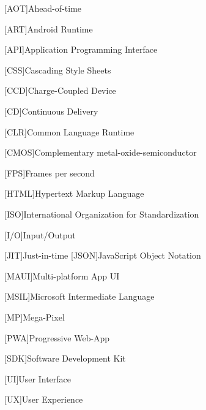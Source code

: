 \begin{acronym}[AAAAA]

[AOT]{Ahead-of-time}

[ART]{Android Runtime}

[API]{Application Programming Interface}

[CSS]{Cascading Style Sheets}

[CCD]{Charge-Coupled Device}

[CD]{Continuous Delivery}

[CLR]{Common Language Runtime}

[CMOS]{Complementary metal-oxide-semiconductor}

[FPS]{Frames per second}

[HTML]{Hypertext Markup Language}

[ISO]{International Organization for Standardization}

[I/O]{Input/Output}

[JIT]{Just-in-time}
[JSON]{JavaScript Object Notation}

[MAUI]{Multi-platform App UI}

[MSIL]{Microsoft Intermediate Language}

[MP]{Mega-Pixel}

[PWA]{Progressive Web-App}

[SDK]{Software Development Kit}

[UI]{User Interface}

[UX]{User Experience}

\end{acronym}